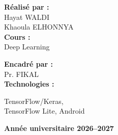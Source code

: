 \documentclass[12pt,a4paper]{report}
\begin{document}
\begin{titlepage}
\vspace{9mm}
\noindent\hspace{4mm}%
\begin{minipage}[t]{0.47\textwidth}
  {\color{navy}\bfseries Réalisé par :}\\[1.5mm]
  Hayat WALDI\\
  Khaoula ELHONNYA\\[5mm]
  {\color{navy}\bfseries Cours :}\\[1.5mm]
  Deep Learning
\end{minipage}\hfill
\begin{minipage}[t]{0.47\textwidth}
  {\color{navy}\bfseries Encadré par :}\\[1.5mm]
  Pr. FIKAL\\[5mm]
  {\color{navy}\bfseries Technologies :}\\[1.5mm]
  \raggedright TensorFlow/Keras,\\ TensorFlow Lite, Android
\end{minipage}

\vfill
\begin{center}
  {\color{navy}\large\bfseries Année universitaire 2026–2027}
\end{center}
\vspace{4mm}
\end{titlepage}

\setcounter{page}{1}


\tableofcontents
\clearpage
{}
\listoffigures
\clearpage
{}
\listoftables
\clearpage















\end{document}
